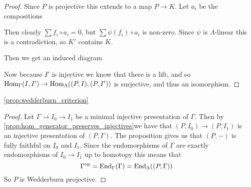 \begin{prop}
\begin{proof}
		Since $P$ is projective this extends to a map $P \to K$. Let $a_i$ be the compositions 
		Then clearly $\sum f_i \circ a_i = 0$, but $\sum \psi(f_i) \circ a_i$ is non-zero. Since $\psi$ is $\Lambda$-linear this is a contradiction, so $K'$ contains $K$.
		
		Then we get an induced diagram
		\begin{center}
		\end{center}
		Now because $I'$ is injective we know that there is a lift, and so $\operatorname{Hom}_\Gamma(I, I') \to \operatorname{Hom}_\Lambda((P,I), (P, I'))$ is surjective, and thus an isomorphism.
	\end{proof} 
\end{prop}

\begin{cor}
	\cref{prop:wedderburn_criterion}
	\begin{proof}
		Let $\Gamma \to I_0 \to I_1$ be a minimal injective presentation of $\Gamma$. Then by \cref{prop:hom_generator_preserves_injectives}we have that $(P, I_0) \to (P,I_1)$ is an injective presentation of $(P,\Gamma)$. The proposition gives us that $(P,-)$ is fully faithful on $I_0$ and $I_1$. Since the endomorphisms of $\Gamma$ are exactly endomorphisms of $I_0 \to I_1$ up to homotopy this means that $$\Gamma^{\operatorname{op}}=\operatorname{End}_\Gamma(\Gamma) = \operatorname{End}_\Lambda((P, \Gamma))$$
		So $P$ is Wedderburn projective.
	\end{proof}
\end{cor}
